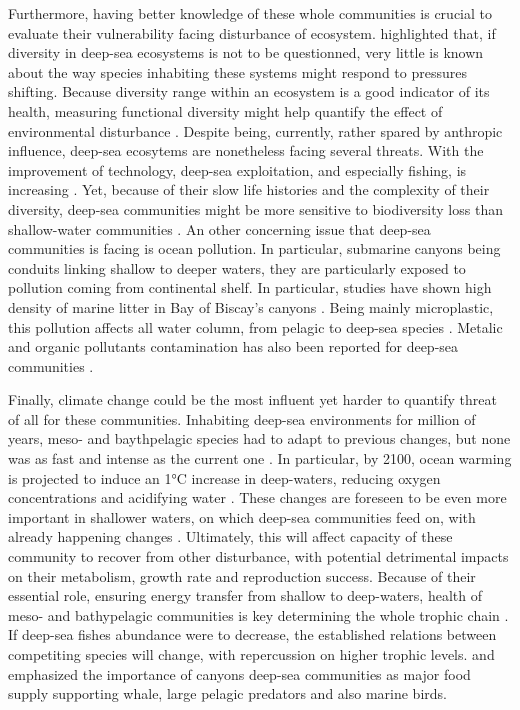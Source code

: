 Furthermore, having better knowledge of these whole communities is crucial to evaluate their vulnerability facing disturbance of ecosystem. \citet{carrington2021} highlighted that, if diversity in deep-sea ecosystems is not to be questionned, very little is known about the way species inhabiting these systems might respond to pressures shifting. Because diversity range within an ecosystem is a good indicator of its health, measuring functional diversity might help quantify the effect of environmental disturbance \citet{carrington2021,villeger2017}. Despite being, currently, rather spared by anthropic influence, deep-sea ecosytems are nonetheless facing several threats. With the improvement of technology, deep-sea exploitation, and especially fishing, is increasing \citep{carrington2021}. Yet, because of their slow life histories and the complexity of their diversity, deep-sea communities might be more sensitive to biodiversity loss than shallow-water communities \citep{carrington2021,danovaro2017}. An other concerning issue that deep-sea communities is facing is ocean pollution. In particular, submarine canyons being conduits linking shallow to deeper waters, they are particularly exposed to pollution coming from continental shelf. In particular, studies have shown high density of marine litter in Bay of Biscay's canyons \citep{vandenbeld2017}. Being mainly microplastic, this pollution affects all water column, from pelagic to deep-sea species \citep{pereira2020}. Metalic and organic pollutants contamination has also been reported for deep-sea communities \citep{spitz2019}.

Finally, climate change could be the most influent yet harder to quantify threat of all for these communities. Inhabiting deep-sea environments for million of years, meso- and baythpelagic species had to adapt to previous changes, but none was as fast and intense as the current one \citep{catul2011}. In particular, by 2100, ocean warming is projected to induce an 1°C increase in deep-waters, reducing oxygen concentrations and acidifying water \citep{danovaro2017}. These changes are foreseen to be even more important in shallower waters, on which deep-sea communities feed on, with already happening changes \citep{danovaro2017}. Ultimately, this will affect capacity of these community to recover from other disturbance, with potential detrimental impacts on their metabolism, growth rate and reproduction success. Because of their essential role, ensuring energy transfer from shallow to deep-waters, health of meso- and bathypelagic communities is key determining the whole trophic chain \citep{davison2015,gaskett2001}. If deep-sea fishes abundance were to decrease, the established relations between competiting species will change, with repercussion on higher trophic levels. \citet{aissi2012} and \citet{kenchington2020} emphasized the importance of canyons deep-sea communities as major food supply supporting whale, large pelagic predators and also marine birds. 

